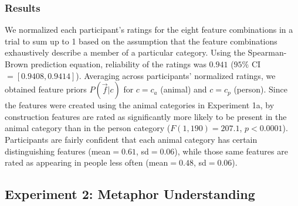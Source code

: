 \documentclass[10pt,letterpaper]{article}
\begin{document}
\subsubsection{Results} 
We normalized each participant's ratings for the eight feature combinations in a trial to sum up to 1 based on the assumption that the feature combinations exhaustively describe a member of a particular category. Using the Spearman-Brown prediction equation, reliability of the ratings was  $0.941$ ($95\%$ CI $=[0.9408, 0.9414] $). Averaging across participants' normalized ratings, we obtained feature priors $P(\vec f | c)$ for $c = c_a$ (animal) and $c = c_p$ (person).
Since the features were created using the animal categories in Experiment 1a, by construction features are rated as significantly more likely to be present in the animal category than in the person category ($F(1, 190) = 207.1$, $p < 0.0001$). Participants are fairly confident that each animal category has certain distinguishing features (mean$= 0.61$, sd$=0.06$), while those same features are rated as appearing in people less often (mean$=0.48$, sd$=0.06$).


\subsection{Experiment 2: Metaphor Understanding}
\end{document}
